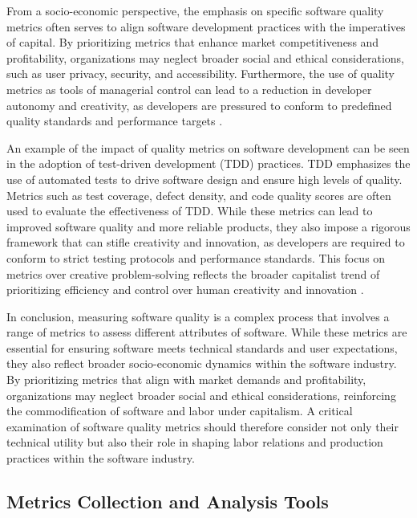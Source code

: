 \begin{refsection}
From a socio-economic perspective, the emphasis on specific software quality metrics often serves to align software development practices with the imperatives of capital. By prioritizing metrics that enhance market competitiveness and profitability, organizations may neglect broader social and ethical considerations, such as user privacy, security, and accessibility. Furthermore, the use of quality metrics as tools of managerial control can lead to a reduction in developer autonomy and creativity, as developers are pressured to conform to predefined quality standards and performance targets \cite[pp.~132-134]{Edwards1980ContestedTerrain}.

An example of the impact of quality metrics on software development can be seen in the adoption of test-driven development (TDD) practices. TDD emphasizes the use of automated tests to drive software design and ensure high levels of quality. Metrics such as test coverage, defect density, and code quality scores are often used to evaluate the effectiveness of TDD. While these metrics can lead to improved software quality and more reliable products, they also impose a rigorous framework that can stifle creativity and innovation, as developers are required to conform to strict testing protocols and performance standards. This focus on metrics over creative problem-solving reflects the broader capitalist trend of prioritizing efficiency and control over human creativity and innovation \cite[pp.~199-202]{Beck2021ExtremeProgramming}.

In conclusion, measuring software quality is a complex process that involves a range of metrics to assess different attributes of software. While these metrics are essential for ensuring software meets technical standards and user expectations, they also reflect broader socio-economic dynamics within the software industry. By prioritizing metrics that align with market demands and profitability, organizations may neglect broader social and ethical considerations, reinforcing the commodification of software and labor under capitalism. A critical examination of software quality metrics should therefore consider not only their technical utility but also their role in shaping labor relations and production practices within the software industry.

\subsection{Metrics Collection and Analysis Tools}


\end{refsection}
